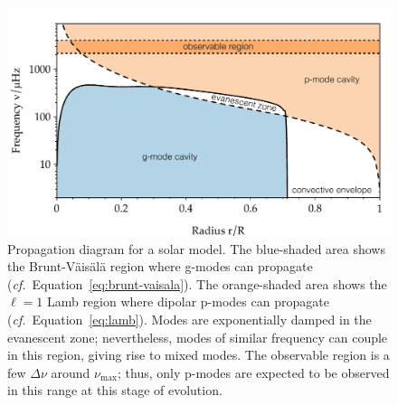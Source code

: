 \begin{figure}
    \centering
    \includegraphics[width=\textwidth]{ch1_introduction/figs/pulse/prop-solar.pdf}
    \caption[Propagation diagram]{Propagation diagram for a solar model. 
    The blue-shaded area shows the Brunt-V\"ais\"al\"a region where g-modes can propagate (\emph{cf.}~Equation~\ref{eq:brunt-vaisala}). 
    The orange-shaded area shows the ${\ell=1}$ Lamb region where dipolar p-modes can propagate (\emph{cf.}~Equation~\ref{eq:lamb}). 
    Modes are exponentially damped in the evanescent zone; nevertheless, modes of similar frequency can couple in this region, giving rise to mixed modes. 
    The observable region is a few ${\Delta\nu}$ around $\nu_{\max}$; thus, only p-modes are expected to be observed in this range at this stage of evolution. 
    \label{fig:propagation}}
\end{figure}




